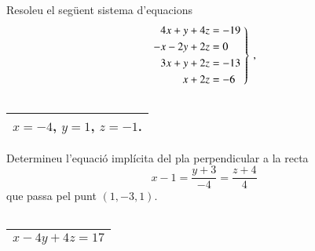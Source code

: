 \documentclass[11pt,catalan]{article}
\begin{document}
\begin{enunciat}
Resoleu el següent sistema d'equacions
\[
  \left.\aligned 4 x + y + 4 z &= -19 \\ - x - 2 y + 2 z &= 0 \\ 3 x + y + 2 z &= -13 \\ x + 2 z &= -6 \endaligned\;\right\}\,,
\]
\end{enunciat}

\begin{quadricula}
\begin{tabular}{|C{5cm}{0.5cm}|}
\hline
  \\
\hline
\end{tabular}
\end{quadricula}

\begin{solucio}
\begin{center}
\begin{tabular}{|C{5cm}{0.5cm}|}
\hline
$x=-4$, $y=1$, $z=-1$. \\
\hline
\end{tabular}
\end{center}
\end{solucio}


\begin{enunciat}
Determineu l'equació implícita del pla perpendicular a la recta 
\[
  x - 1 = \frac{y + 3}{-4} = \frac{z + 4}{4}
\]
que passa pel punt $(1,-3,1)$.
\end{enunciat}

\begin{quadricula}
\begin{tabular}{|C{5cm}{0.5cm}|}
\hline
  \\
\hline
\end{tabular}
\end{quadricula}

\begin{solucio}
\begin{center}
\begin{tabular}{|C{5cm}{0.5cm}|}
\hline
$x - 4 y + 4 z = 17$ \\
\hline
\end{tabular}
\end{center}
\end{solucio}
\end{document}
